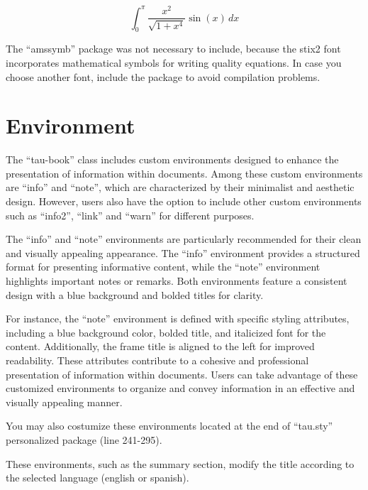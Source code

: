 \documentclass[10pt,a4paper,twoside]{tau-book}
\begin{document}
        \begin{equation}
            \int_{0}^{\pi} \frac{x^2}{\sqrt{1 + x^4}} \sin(x) \, dx
        \end{equation}

    \begin{info}
        The ``amssymb'' package was not necessary to include, because the stix2 font incorporates mathematical symbols for writing quality equations. In case you choose another font, include the package to avoid compilation problems.
    \end{info}

    \section{Environment}

        The ``tau-book'' class includes custom environments designed to enhance the presentation of information within documents. Among these custom environments are ``info'' and ``note'', which are characterized by their minimalist and aesthetic design. However, users also have the option to include other custom environments such as ``info2'', ``link'' and ``warn'' for different purposes.

        The ``info'' and ``note'' environments are particularly recommended for their clean and visually appealing appearance. The ``info'' environment provides a structured format for presenting informative content, while the ``note'' environment highlights important notes or remarks. Both environments feature a consistent design with a blue background and bolded titles for clarity.

        For instance, the ``note'' environment is defined with specific styling attributes, including a blue background color, bolded title, and italicized font for the content. Additionally, the frame title is aligned to the left for improved readability. These attributes contribute to a cohesive and professional presentation of information within documents.  Users can take advantage of these customized environments to organize and convey information in an effective and visually appealing manner.

        You may also costumize these environments located at the end of ``tau.sty'' personalized package (line 241-295).

        \begin{note}
            These environments, such as the summary section, modify the title according to the selected language (english or spanish).
        \end{note}
\end{document}
